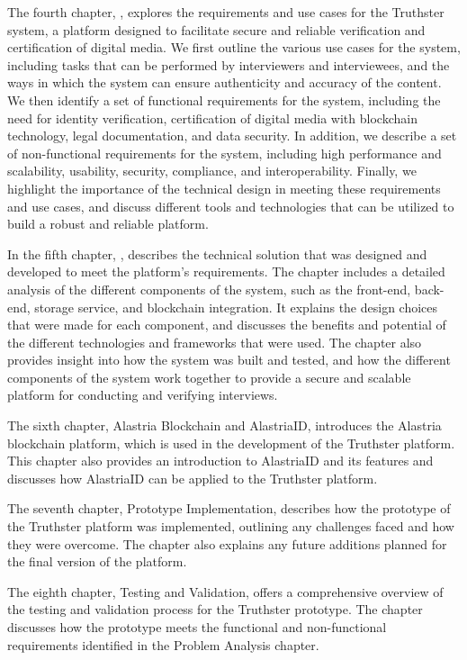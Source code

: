 \documentclass[target=mst,aauheader=]{thud}
\begin{document}
The fourth chapter, \textbf{}, explores the requirements and use cases for the Truthster system, a platform designed to facilitate secure and reliable verification and certification of digital media. We first outline the various use cases for the system, including tasks that can be performed by interviewers and interviewees, and the ways in which the system can ensure authenticity and accuracy of the content. We then identify a set of functional requirements for the system, including the need for identity verification, certification of digital media with blockchain technology, legal documentation, and data security. In addition, we describe a set of non-functional requirements for the system, including high performance and scalability, usability, security, compliance, and interoperability. Finally, we highlight the importance of the technical design in meeting these requirements and use cases, and discuss different tools and technologies that can be utilized to build a robust and reliable platform.\par
In the fifth chapter, \textbf{}, describes the technical solution that was designed and developed to meet the platform's requirements. The chapter includes a detailed analysis of the different components of the system, such as the front-end, back-end, storage service, and blockchain integration. It explains the design choices that were made for each component, and discusses the benefits and potential of the different technologies and frameworks that were used. The chapter also provides insight into how the system was built and tested, and how the different components of the system work together to provide a secure and scalable platform for conducting and verifying interviews.\par
The sixth chapter, Alastria Blockchain and AlastriaID, introduces the Alastria blockchain platform, which is used in the development of the Truthster platform. This chapter also provides an introduction to AlastriaID and its features and discusses how AlastriaID can be applied to the Truthster platform.\par
The seventh chapter, Prototype Implementation, describes how the prototype of the Truthster platform was implemented, outlining any challenges faced and how they were overcome. The chapter also explains any future additions planned for the final version of the platform.\par
The eighth chapter, Testing and Validation, offers a comprehensive overview of the testing and validation process for the Truthster prototype. The chapter discusses how the prototype meets the functional and non-functional requirements identified in the Problem Analysis chapter.\par
\end{document}
